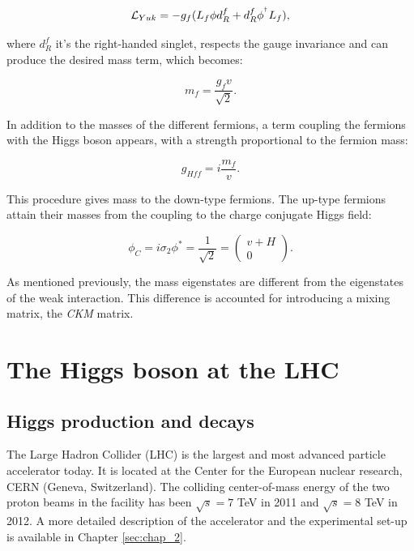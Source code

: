 \begin{equation}
\mathcal{L}_{Yuk}=-g_f(L_f \phi d^f_R + d^f_R \phi^{^\dagger} L_f),
\end{equation}

where $d^f_R$ it's the right-handed singlet, respects the gauge invariance and can produce the desired mass term, which becomes:

\begin{equation}
m_f = \frac{g_f v}{\sqrt{2}}.
\end{equation}

In addition to the masses of the different fermions, a term coupling the fermions with the Higgs boson appears, with a strength proportional to the fermion mass:

\begin{equation}
g_{Hff}=i\frac{m_f}{v}.
\end{equation}

This procedure gives mass to the down-type fermions. 
The up-type fermions attain their masses from the coupling to the charge conjugate Higgs field:

\begin{equation}
\phi_C = i \sigma_2 \phi^{\ast} = \frac{1}{\sqrt{2}}=\begin{pmatrix}
v+H\\ 
0
\end{pmatrix}.
\end{equation}

As mentioned previously, the mass eigenstates are different from the eigenstates of the weak interaction. This difference is accounted for introducing a mixing matrix, the \emph{CKM} matrix. 

\section{The Higgs boson at the LHC}

\subsection{Higgs production and decays}

The Large Hadron Collider (LHC) is the largest and most advanced particle accelerator today. It is located at the Center for the European nuclear research, CERN (Geneva, Switzerland). 
The colliding center-of-mass energy of the two proton beams in the facility has been $\sqrt{s} = 7$ TeV in 2011 and $\sqrt{s} = 8$ TeV in 2012. A more detailed description of the accelerator and the experimental set-up is available in Chapter \ref{sec:chap_2}.

